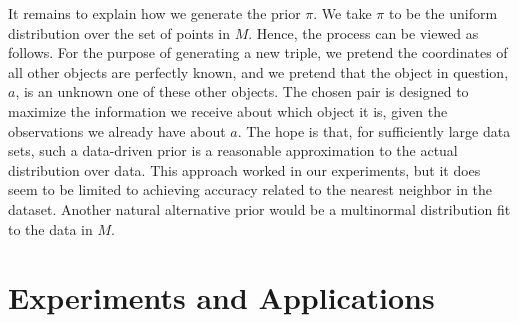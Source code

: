 \documentclass{article}
\begin{document}
It remains to explain how we generate the prior $\pi$.  We take $\pi$ to be the uniform distribution over the set of points in $M$.  Hence, the process can be viewed as follows.  For the purpose of generating a new triple, we pretend the coordinates of all other objects are perfectly known, and we pretend that the object in question, $a$, is an unknown one of these other objects.  The chosen pair is designed to maximize the information we receive about which object it is, given the observations we already have about $a$.  The hope is that, for sufficiently large data sets, such a data-driven prior is a reasonable approximation to the actual distribution over data.  This approach worked in our experiments, but it does seem to be limited to achieving accuracy related to the nearest neighbor in the dataset.  Another natural alternative prior would be a multinormal distribution fit to the data in $M$.





\section{Experiments and Applications}

\end{document}

